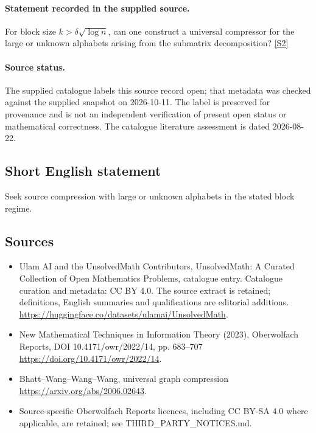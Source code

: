 \documentclass[11pt]{article}
\begin{document}
\paragraph{Statement recorded in the supplied source.}
For block size $k>\delta\sqrt{\log n}$, can one construct a universal compressor for the large or unknown alphabets arising from the submatrix decomposition? \href{https://doi.org/10.4171/owr/2022/14}{[S2]}
\paragraph{Source status.}
The supplied catalogue labels this source record open; that metadata was checked against the supplied snapshot on 2026-10-11. The label is preserved for provenance and is not an independent verification of present open status or mathematical correctness. The catalogue literature assessment is dated 2026-08-22.
\subsection{Short English statement}
Seek source compression with large or unknown alphabets in the stated block regime.
\subsection{Sources}
\begin{itemize}
\item[S1] Ulam AI and the UnsolvedMath Contributors, UnsolvedMath: A Curated Collection of Open Mathematics Problems, catalogue entry. Catalogue curation and metadata: CC BY 4.0. The source extract is retained; definitions, English summaries and qualifications are editorial additions.
\url{https://huggingface.co/datasets/ulamai/UnsolvedMath}.
\item[S2] New Mathematical Techniques in Information Theory (2023), Oberwolfach Reports, DOI 10.4171/owr/2022/14, pp. 683--707
\url{https://doi.org/10.4171/owr/2022/14}.
\item[S3] Bhatt--Wang--Wang--Wang, universal graph compression
\url{https://arxiv.org/abs/2006.02643}.
\item Source-specific Oberwolfach Reports licences, including CC BY-SA 4.0 where applicable, are retained; see THIRD\_PARTY\_NOTICES.md.
\end{itemize}
\end{document}
